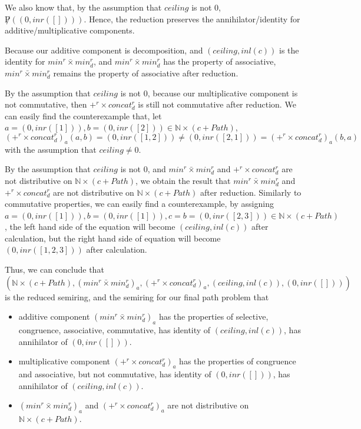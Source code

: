 \documentclass[a4paper,12pt,twoside,openright]{report}
\begin{document}
We also know that, by the assumption that $ceiling$ is not 0, $\not P((0,inr([])))$. Hence, the reduction preserves the annihilator/identity for additive/multiplicative components.
 
Because our additive component is decomposition, and $(ceiling,inl (c))$ is the identity for $min^r \bar{\times} min^r_d$, and $min^r \bar{\times} min^r_d$ has the property of associative, $min^r \bar{\times} min^r_d$ remains the property of associative after reduction.

By the assumption that $ceiling$ is not 0, because our multiplicative component is not commutative, then $+^r \times concat^r_d$ is still not commutative after reduction. We can easily find the counterexample that, let $a = (0,inr([1])), b = (0,inr([2])) \in \mathbb{N} \times (c + Path)$, 
\[(+^r \times concat^r_d)_a(a,b) = (0,inr([1,2])) \neq (0,inr([2,1])) = (+^r \times concat^r_d)_a(b,a)\] with the assumption that $ceiling \neq 0$.

By the assumption that $ceiling$ is not 0, and $min^r \bar{\times} min^r_d$ and $+^r \times concat^r_d$ are not distributive on $\mathbb{N} \times (c + Path)$, we obtain the result that $min^r \bar{\times} min^r_d$ and $+^r \times concat^r_d$ are not distributive on $\mathbb{N} \times (c + Path)$ after reduction. Similarly to commutative properties, we can easily find a counterexample, by assigning $a = (0,inr([1])), b = (0,inr([1])), c = b = (0,inr([2,3])) \in \mathbb{N} \times (c + Path)$, the left hand side of the equation will become $(ceiling,inl (c))$ after calculation, but the right hand side of equation will become $(0,inr([1,2,3]))$ after calculation.

Thus, we can conclude that \[(\mathbb{N} \times (c + Path),(min^r \bar{\times} min^r_d)_a,(+^r \times concat^r_d)_a,(ceiling,inl(c)),(0,inr([])))\] is the reduced semiring, and the semiring for our final path problem that 
\begin{itemize}
  \item additive component $(min^r \bar{\times} min^r_d)_a$ has the properties of selective, congruence, associative, commutative, has identity of $(ceiling,inl(c))$, has annihilator of $(0,inr([]))$.
  \item multiplicative component $(+^r \times concat^r_d)_a$ has the properties of congruence and associative, but not commutative, has identity of $(0,inr([]))$, has annihilator of $(ceiling,inl(c))$.
  \item $(min^r \bar{\times} min^r_d)_a$ and $(+^r \times concat^r_d)_a$ are not distributive on $\mathbb{N} \times (c + Path)$.
\end{itemize}
\end{document}
